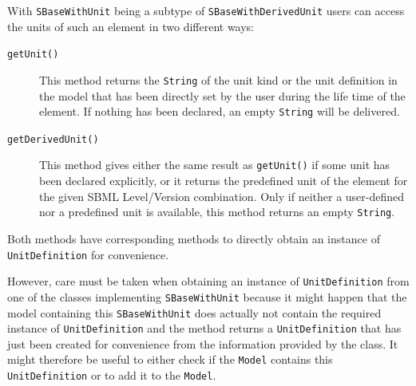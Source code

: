With \texttt{SBaseWithUnit}
%
being a subtype of \texttt{SBaseWithDerivedUnit}
%
users can access the units of such an element in two different ways:
\begin{description}
 \item[\texttt{getUnit()}] This method returns the
 \texttt{String}
 of the unit kind or the unit definition in the model
 that has been directly set by the user
 during the life time of the element. If nothing has been declared, an empty
 \texttt{String} will be delivered.
 \item[\texttt{getDerivedUnit()}] This method gives either the same result as
 \texttt{getUnit()} if some unit has been declared explicitly, or it returns the
 predefined unit of the element for the given SBML Level/Version combination.
 Only if neither a user-defined nor a predefined unit is available, this method
 returns an empty \texttt{String}.
\end{description}
Both methods have corresponding methods to directly obtain an instance of
\texttt{UnitDefinition}
%
for convenience.

However, care must be taken when obtaining an instance of
\texttt{UnitDefinition}
%
from one of the classes implementing \texttt{SBaseWithUnit}
%
because it might happen that the model containing this
\texttt{SBaseWithUnit}
%
does actually not contain the required instance of \texttt{UnitDefinition} and
the method returns a \texttt{UnitDefinition} that has just been created for
convenience from the information provided by the class. It might therefore be
useful to either check if the \texttt{Model}
contains this \texttt{UnitDefinition}
%
or to add it to the \texttt{Model}.

